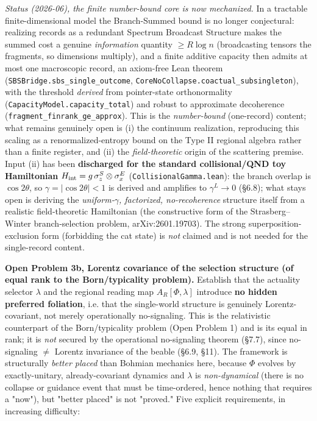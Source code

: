 \documentclass[11pt,a4paper]{article}
\begin{document}
\emph{Status (2026-06), the finite number-bound core is now mechanized.} In a tractable finite-dimensional model the Branch-Summed bound is no longer conjectural: realizing records as a redundant Spectrum Broadcast Structure makes the summed cost a genuine \emph{information} quantity $\ge R\log n$ (broadcasting tensors the fragments, so dimensions multiply), and a finite additive capacity then admits at most one macroscopic record, an axiom-free Lean theorem (\texttt{SBSBridge.sbs\_single\_outcome}, \texttt{CoreNoCollapse.coactual\_subsingleton}), with the threshold \emph{derived} from pointer-state orthonormality (\texttt{CapacityModel.capacity\_total}) and robust to approximate decoherence (\texttt{fragment\_finrank\_ge\_approx}). This is the \emph{number-bound} (one-record) content; what remains genuinely open is (i) the continuum realization, reproducing this scaling as a renormalized-entropy bound on the Type II regional algebra rather than a finite register, and (ii) the \emph{field-theoretic} origin of the scattering premise. Input (ii) has been \textbf{discharged for the standard collisional/QND toy Hamiltonian} $H_{\rm int}=g\,\sigma_z^S\otimes\sigma_x^E$ (\texttt{CollisionalGamma.lean}): the branch overlap is $\cos 2\theta$, so $\gamma=|\cos 2\theta|<1$ is derived and amplifies to $\gamma^L\to0$ (§6.8); what stays open is deriving the \emph{uniform-$\gamma$, factorized, no-recoherence} structure itself from a realistic field-theoretic Hamiltonian (the constructive form of the Strasberg–Winter branch-selection problem, arXiv:2601.19703). The strong superposition-exclusion form (forbidding the cat state) is \emph{not} claimed and is not needed for the single-record content.

\textbf{Open Problem 3b, Lorentz covariance of the selection structure (of equal rank to the Born/typicality problem).}
Establish that the actuality selector $\lambda$ and the regional reading map $A_R[\Phi,\lambda]$ introduce \textbf{no hidden preferred foliation}, i.e. that the single-world structure is genuinely Lorentz-covariant, not merely operationally no-signaling. This is the relativistic counterpart of the Born/typicality problem (Open Problem 1) and is its equal in rank; it is \emph{not} secured by the operational no-signaling theorem (§7.7), since no-signaling $\neq$ Lorentz invariance of the beable (§6.9, §11). The framework is structurally \emph{better placed} than Bohmian mechanics here, because $\Phi$ evolves by exactly-unitary, already-covariant dynamics and $\lambda$ is \emph{non-dynamical} (there is no collapse or guidance event that must be time-ordered, hence nothing that requires a "now"), but "better placed" is not "proved." Five explicit requirements, in increasing difficulty:
\end{document}
